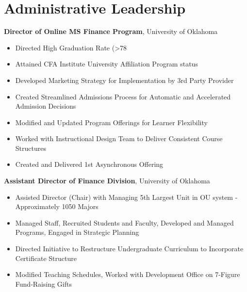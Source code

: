 \documentclass[11pt,a4paper,]{awesome-cv}
\let\oldtextbf\textbf
\renewcommand{\textbf}[1]{\oldtextbf{#1}\vspace{-1mm}}
\begin{document}
\makecvheader






\section{Administrative Leadership}\label{administrative-leadership}

\textbf{Director of Online MS Finance Program}, University of Oklahoma

\begin{itemize}
\item Directed High Graduation Rate (>78%
\item Attained CFA Institute University Affiliation Program status
\item Developed Marketing Strategy for Implementation by 3rd Party Provider
\item Created Streamlined Admissions Process for Automatic and Accelerated Admission Decisions
\item Modified and Updated Program Offerings for Learner Flexibility
\item Worked with Instructional Design Team to Deliver Consistent Course Structures
\item Created and Delivered 1st Asynchronous Offering
\end{itemize}

\textbf{Assistant Director of Finance Division}, University of Oklahoma

\begin{itemize}
\item Assisted Director (Chair) with Managing 5th Largest Unit in OU system - Approximately 1050 Majors
\item Managed Staff, Recruited Students and Faculty, Developed and Managed Programs, Engaged in Strategic Planning
\item Directed Initiative to Restructure Undergraduate Curriculum to Incorporate Certificate Structure
\item Modified Teaching Schedules, Worked with Development Office on 7-Figure Fund-Raising Gifts
\end{itemize}
\end{document}
